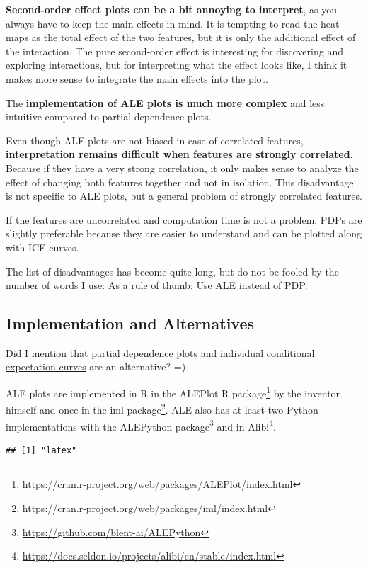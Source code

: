 \documentclass[
  11pt,
]{scrbook}
\renewcommand{\href}[2]{#2\footnote{\url{#1}}}
\begin{document}
\textbf{Second-order effect plots can be a bit annoying to interpret}, as you always have to keep the main effects in mind.
It is tempting to read the heat maps as the total effect of the two features, but it is only the additional effect of the interaction.
The pure second-order effect is interesting for discovering and exploring interactions, but for interpreting what the effect looks like, I think it makes more sense to integrate the main effects into the plot.

The \textbf{implementation of ALE plots is much more complex} and less intuitive compared to partial dependence plots.

Even though ALE plots are not biased in case of correlated features, \textbf{interpretation remains difficult when features are strongly correlated}.
Because if they have a very strong correlation, it only makes sense to analyze the effect of changing both features together and not in isolation.
This disadvantage is not specific to ALE plots, but a general problem of strongly correlated features.

If the features are uncorrelated and computation time is not a problem, PDPs are slightly preferable because they are easier to understand and can be plotted along with ICE curves.

The list of disadvantages has become quite long, but do not be fooled by the number of words I use:
As a rule of thumb: Use ALE instead of PDP.

\hypertarget{implementation-and-alternatives}{%
\subsection{Implementation and Alternatives}\label{implementation-and-alternatives}}

Did I mention that \protect\hyperlink{pdp}{partial dependence plots} and \protect\hyperlink{ice}{individual conditional expectation curves} are an alternative? =)

ALE plots are implemented in R in the \href{https://cran.r-project.org/web/packages/ALEPlot/index.html}{ALEPlot R package} by the inventor himself and once in the \href{https://cran.r-project.org/web/packages/iml/index.html}{iml package}.
ALE also has at least two Python implementations with the \href{https://github.com/blent-ai/ALEPython}{ALEPython package} and in \href{https://docs.seldon.io/projects/alibi/en/stable/index.html}{Alibi}.

\begin{verbatim}
## [1] "latex"
\end{verbatim}
\end{document}
